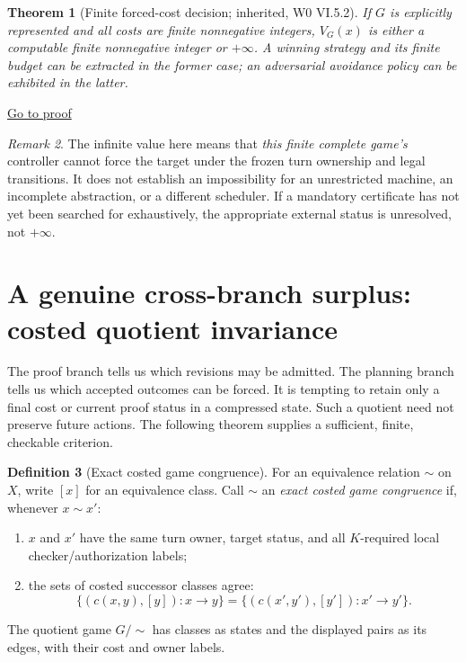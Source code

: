 \documentclass[11pt,letterpaper]{article}
\newtheorem{theorem}{Theorem}[section]
\theoremstyle{definition}
\newtheorem{definition}[theorem]{Definition}
\theoremstyle{remark}
\newtheorem{remark}[theorem]{Remark}
\newcommand{\backproof}[1]{\hfill\hyperlink{proof:#1}{\footnotesize Go to proof}}
\begin{document}
\begin{theorem}[Finite forced-cost decision; inherited, W0 VI.5.2]\label{thm:finite}\hypertarget{stmt:finite}{}
If $G$ is explicitly represented and all costs are finite nonnegative integers, $V_G(x)$ is either a computable finite nonnegative integer or $+\infty$. A winning strategy and its finite budget can be extracted in the former case; an adversarial avoidance policy can be exhibited in the latter.
\end{theorem}\backproof{finite}

\begin{remark}
The infinite value here means that \emph{this finite complete game's} controller cannot force the target under the frozen turn ownership and legal transitions. It does not establish an impossibility for an unrestricted machine, an incomplete abstraction, or a different scheduler. If a mandatory certificate has not yet been searched for exhaustively, the appropriate external status is unresolved, not $+\infty$.
\end{remark}

\section{A genuine cross-branch surplus: costed quotient invariance}
The proof branch tells us which revisions may be admitted. The planning branch tells us which accepted outcomes can be forced. It is tempting to retain only a final cost or current proof status in a compressed state. Such a quotient need not preserve future actions. The following theorem supplies a sufficient, finite, checkable criterion.

\begin{definition}[Exact costed game congruence]
For an equivalence relation $\sim$ on $X$, write $[x]$ for an equivalence class. Call $\sim$ an \emph{exact costed game congruence} if, whenever $x\sim x'$:
\begin{enumerate}[label=(\roman*)]
\item $x$ and $x'$ have the same turn owner, target status, and all $K$-required local checker/authorization labels;
\item the sets of costed successor classes agree:
\[
\big\{(c(x,y),[y]):x\to y\big\}
=\big\{(c(x',y'),[y']):x'\to y'\big\}.
\]
\end{enumerate}
The quotient game $G/{\sim}$ has classes as states and the displayed pairs as its edges, with their cost and owner labels.
\end{definition}
\end{document}
